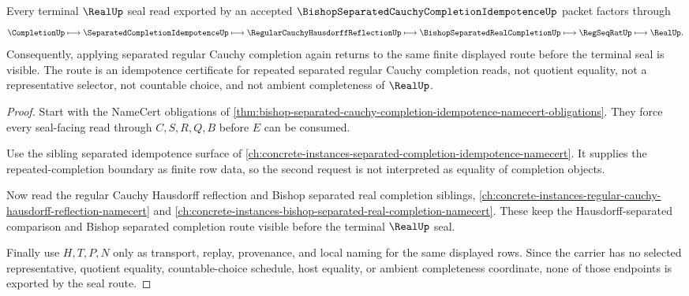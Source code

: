 \begin{theorem}
\label{thm:bishop-separated-cauchy-completion-idempotent-seal-route}
Every terminal $\RealUp$ seal read exported by an accepted $\BishopSeparatedCauchyCompletionIdempotenceUp$ packet factors through
$$
\CompletionUp \longmapsto \SeparatedCompletionIdempotenceUp \longmapsto \RegularCauchyHausdorffReflectionUp \longmapsto \BishopSeparatedRealCompletionUp \longmapsto \RegSeqRatUp \longmapsto \RealUp .
$$
Consequently, applying separated regular Cauchy completion again returns to the same finite displayed route before the terminal seal is visible. The route is an idempotence certificate for repeated separated regular Cauchy completion reads, not quotient equality, not a representative selector, not countable choice, and not ambient completeness of $\RealUp$.
\end{theorem}
\begin{proof}
Start with the NameCert obligations of \autoref{thm:bishop-separated-cauchy-completion-idempotence-namecert-obligations}. They force every seal-facing read through $C,S,R,Q,B$ before $E$ can be consumed.

Use the sibling separated idempotence surface of \autoref{ch:concrete-instances-separated-completion-idempotence-namecert}. It supplies the repeated-completion boundary as finite row data, so the second request is not interpreted as equality of completion objects.

Now read the regular Cauchy Hausdorff reflection and Bishop separated real completion siblings, \autoref{ch:concrete-instances-regular-cauchy-hausdorff-reflection-namecert} and \autoref{ch:concrete-instances-bishop-separated-real-completion-namecert}. These keep the Hausdorff-separated comparison and Bishop separated completion route visible before the terminal $\RealUp$ seal.

Finally use $H,T,P,N$ only as transport, replay, provenance, and local naming for the same displayed rows. Since the carrier has no selected representative, quotient equality, countable-choice schedule, host equality, or ambient completeness coordinate, none of those endpoints is exported by the seal route.
\end{proof}



